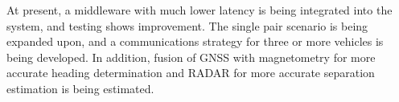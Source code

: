 \documentclass[twocolumn,10pt]{article}
\begin{document}
  At present, a middleware with much lower latency is being integrated into the system, and testing shows improvement.  The single pair scenario is being expanded upon, and a communications strategy for three or more vehicles is being developed.  In addition, fusion of GNSS with magnetometry for more accurate heading determination and RADAR for more accurate separation estimation is being estimated.



\nocite{CofieldUGThesis}

\end{document}
